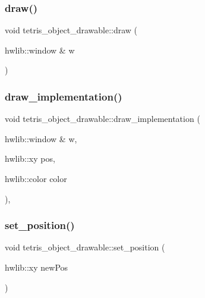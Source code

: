 \subsubsection{\texorpdfstring{draw()}{draw()}}
{\footnotesize\ttfamily void tetris\+\_\+object\+\_\+drawable\+::draw (\begin{DoxyParamCaption}\item[{hwlib\+::window \&}]{w }\end{DoxyParamCaption})}

\mbox{\label{classtetris__object__drawable_a769565a2a650fa1a8b1c11825a6ddafa}} 
\subsubsection{\texorpdfstring{draw\+\_\+implementation()}{draw\_implementation()}}
{\footnotesize\ttfamily void tetris\+\_\+object\+\_\+drawable\+::draw\+\_\+implementation (\begin{DoxyParamCaption}\item[{hwlib\+::window \&}]{w,  }\item[{hwlib\+::xy}]{pos,  }\item[{hwlib\+::color}]{color }\end{DoxyParamCaption})\hspace{0.3cm}{\ttfamily [protected]}, {\ttfamily [virtual]}}

\mbox{\label{classtetris__object__drawable_a6442249846e75243311d84cd58e0514e}} 
\subsubsection{\texorpdfstring{set\+\_\+position()}{set\_position()}}
{\footnotesize\ttfamily void tetris\+\_\+object\+\_\+drawable\+::set\+\_\+position (\begin{DoxyParamCaption}\item[{hwlib\+::xy}]{new\+Pos }\end{DoxyParamCaption})\hspace{0.3cm}{\ttfamily [inline]}}



